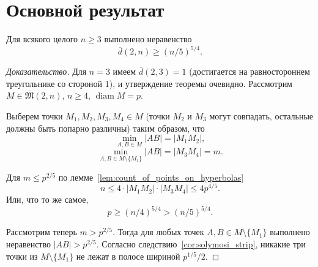 \documentclass[11pt,twoside,draft
]{article}
\begin{document}
\section{Основной результат}

\begin{Theorem}
	\label{thm:main_result}
	Для всякого целого $n \geq 3$ выполнено неравенство
	\begin{equation}
		\overline{d}(2,n) \geq (n/5)^{5/4}
		.
	\end{equation}
\end{Theorem}

\begin{proof}[Доказательство]
	Для $n = 3$ имеем $\overline{d}(2,3) = 1$ (достигается на равностороннем треугольнике со стороной 1),
	и утверждение теоремы очевидно.
	Рассмотрим $M\in\overline{\mathfrak{M}}(2,n)$, $n \geq 4$, $\operatorname{diam} M = p$.

	Выберем точки $M_1, M_2, M_3, M_4 \in M$
	(точки $M_2$ и $M_3$ могут совпадать, остальные должны быть попарно различны) таким образом, что
	\begin{equation}
		\min_{A, B \in M} |AB| = |M_1 M_2|
		,
	\end{equation}
	\begin{equation}
		\min_{A, B \in M \setminus \{M_1\}} |AB| = |M_3 M_4| = m
		.
	\end{equation}

	Для $m \leq p^{2/5}$ по лемме~\ref{lem:count_of_points_on_hyperbolas}
	\begin{equation}
		n \leq 4 \cdot |M_1 M_2| \cdot |M_3 M_4| \leq  4 p^{4/5}
		.
	\end{equation}
	Или, что то же самое,
	\begin{equation}
		\label{eq:hyperbolas_5_4}
		p \geq (n/4) ^ {5/4} > (n/5) ^ {5/4}
		.
	\end{equation}

	Рассмотрим теперь $m > p^{2/5}$.
	Тогда для любых точек $A,B \in M\setminus\{M_1\}$ выполнено неравенство $|AB| > p^{2/5}$.
	Согласно следствию~\ref{cor:solymosi_strip}, никакие три точки из  $M\setminus\{M_1\}$
	не лежат в полосе шириной $p^{1/5} / 2$.




\end{proof}
\end{document}
